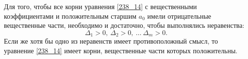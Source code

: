 \begin{to_thr}
	Для того, чтобы все корни уравнения \eqref{238_14} с вещественными коэффициентами и положительным старшим $a_0$ имели отрицательные вещественные части, необходимо и достаточно, чтобы выполнялись неравенства:
	\begin{equation}
		\Delta_1 >0,
		\
		\Delta_2 > 0,
		\ \ldots \ 
		\Delta_m >0.
	\end{equation}
	Если же хотя бы одно из неравенств имеет противоположный смысл, то уравнение \eqref{238_14} имеет корни, вещественные части которых положительны.
\end{to_thr}